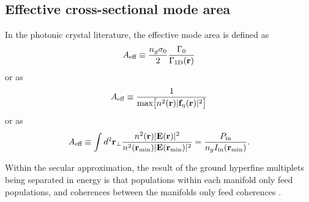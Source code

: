 \documentclass[preprint,aps,pra,onecolumn]{revtex4-1} %
\newcommand{\oneD}{{\rm 1D}}
\newcommand{\inp}{{\rm in}}
\begin{document}
\begin{appendix}
{%
\section{Effective cross-sectional mode area} \label{Appendix::ModeArea}
In the photonic crystal literature, the effective mode area is defined as \cite{goban_atomlight_2014}
	\begin{align}
		A_\eff \equiv \frac{n_g \sigma_0}{2} \frac{\Gamma_0}{\Gamma_\oneD(\mathbf{r})}
	\end{align}
or as \cite{manga_rao_single_2007}
	\begin{align}
		A_{\text{eff}} \equiv \frac{1}{ \mbox{max} \big[ n^2(\mathbf{r}) |\mathbf{f}_\eta(\mathbf{r})|^2 \big]}
	\end{align}
or as \cite{hung_trapped_2013}
	\begin{align}
		A_\eff \equiv \int d^2 \mathbf{r}_\perp \frac{n^2(\mathbf{r}) |\mathbf{E}(\mathbf{r})|^2 }{n^2(\mathbf{r}_{\rm min}) |\mathbf{E}(\mathbf{r}_{\rm min})|^2 } =  \frac{P_\inp}{ n_g  I_\inp(\mathbf{r}_{\rm min}) }.
	\end{align}
	
Within the secular approximation, the result of the ground hyperfine multiplets being separated in energy is that populations within each manifold only feed populations, and coherences between the manifolds only feed coherences \cite{deutsch_quantum_2010}.  
}

\end{appendix}
\end{document}
